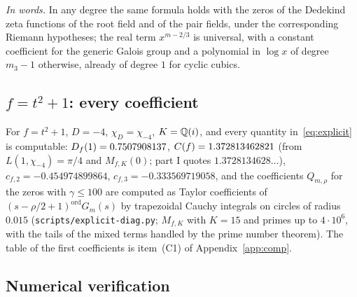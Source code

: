 \documentclass[11pt,a4paper]{article}
\theoremstyle{remark}\newtheorem{remark}[theorem]{Remark}
\begin{document}
\emph{In words.} In any degree the same formula holds with the zeros of the Dedekind zeta functions of the
root field and of the pair fields, under the corresponding Riemann hypotheses; the real term $x^{m-2/3}$
is universal, with a constant coefficient for the generic Galois group and a polynomial in $\log x$ of degree
$m_3-1$ otherwise, already of degree $1$ for cyclic cubics.

\subsection{$f=t^2+1$: every coefficient}\label{sec:t2p1}

For $f=t^2+1$, $D=-4$, $\chi_D=\chi_{-4}$, $K=\mathbb{Q}(i)$, and every quantity in~\eqref{eq:explicit} is computable:
$D_f(1)=0.7507908137$, $C(f)=1.372813462821$ (from $L(1,\chi_{-4})=\pi/4$ and $M_{f,K}(0)$; part I quotes
$1.3728134628\dots$), $c_{f,2}=-0.454974899864$, $c_{f,3}=-0.333569719058$, and the coefficients
$Q_{m,\rho}$ for the zeros with $\gamma\le100$ are computed as Taylor coefficients of
$(s-\rho/2+1)^{\mathrm{ord}}G_m(s)$ by trapezoidal Cauchy integrals on circles of radius $0.015$
(\texttt{scripts/explicit-diag.py}; $M_{f,K}$ with $K=15$ and primes up to $4\cdot10^6$, with the tails of the
mixed terms handled by the prime number theorem). The table of the first
coefficients is item~(C1) of Appendix~\ref{app:comp}.

\subsection{Numerical verification}\label{sec:num}

\end{document}

